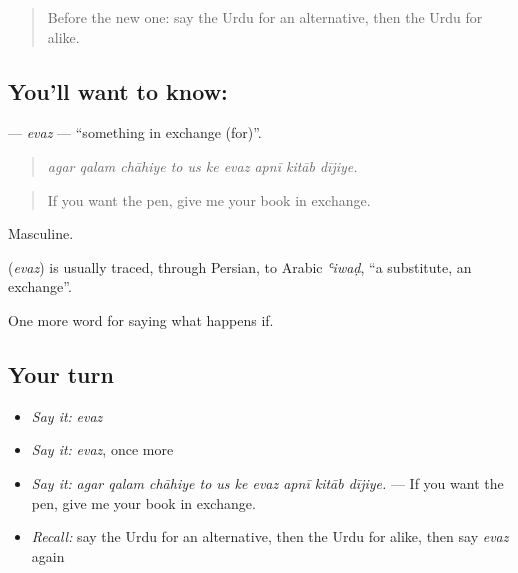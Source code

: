 \label{lesson:UR-C537-evaz}



\begin{quote}
Before the new one: say the Urdu for an alternative, then the Urdu for alike.
\end{quote}

\subsection*{You'll want to know: }
\textbf{} — \emph{evaz} — \textquotedblleft{}something in exchange (for)\textquotedblright{}.

\begin{quote}
         
\end{quote}

\begin{quote}
\emph{agar qalam chāhiye to us ke evaz apnī kitāb dījiye.}
\end{quote}

\begin{quote}
If you want the pen, give me your book in exchange.
\end{quote}

Masculine.

\begin{cousinweb}
\textbf{} (\emph{evaz}) is usually traced, through Persian, to Arabic \emph{ʿiwaḍ}, \textquotedblleft{}a substitute, an exchange\textquotedblright{}.
\end{cousinweb}

\begin{grammarlens}[title={What you've built}]
One more word for saying what happens if.
\end{grammarlens}

\subsection*{Your turn}
\begin{itemize}
\raggedright
  \item \emph{Say it:} \emph{evaz}
  \item \emph{Say it:} \emph{evaz}, once more
  \item \emph{Say it:} \emph{agar qalam chāhiye to us ke evaz apnī kitāb dījiye.} — If you want the pen, give me your book in exchange.
  \item \emph{Recall:} say the Urdu for an alternative, then the Urdu for alike, then say \emph{evaz} again
\end{itemize}

